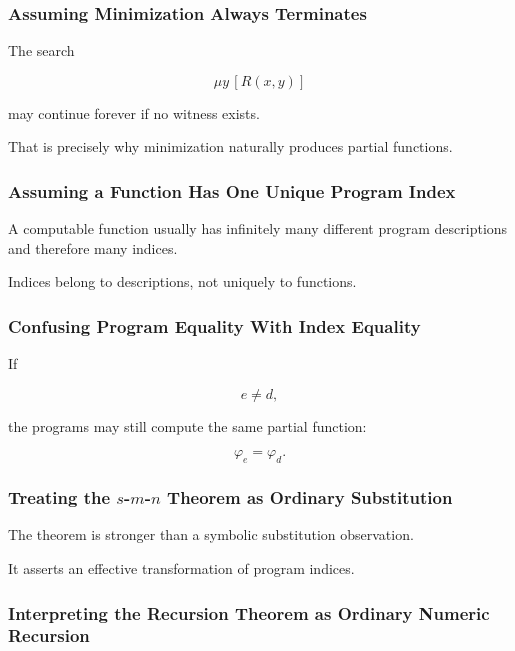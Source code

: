 \subsubsection{Assuming Minimization Always Terminates}

The search

\[
\mu y\,[R(x,y)]
\]

may continue forever if no witness exists.

That is precisely why minimization naturally produces partial functions.

\subsubsection{Assuming a Function Has One Unique Program Index}

A computable function usually has infinitely many different program
descriptions and therefore many indices.

Indices belong to descriptions, not uniquely to functions.

\subsubsection{Confusing Program Equality With Index Equality}

If

\[
e\neq d,
\]

the programs may still compute the same partial function:

\[
\varphi_e=\varphi_d.
\]

\subsubsection{Treating the \(s\)-\(m\)-\(n\) Theorem as Ordinary Substitution}

The theorem is stronger than a symbolic substitution observation.

It asserts an effective transformation of program indices.

\subsubsection{Interpreting the Recursion Theorem as Ordinary Numeric Recursion}

